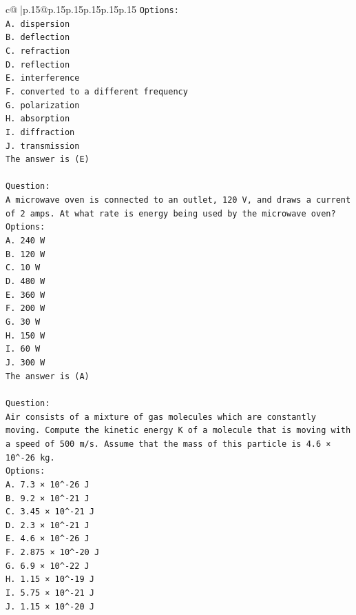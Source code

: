 \documentclass{article}
\begin{document}
{\begin{supertabular}{c@{$\;$}|p{.15\linewidth}@{}p{.15\linewidth}p{.15\linewidth}p{.15\linewidth}p{.15\linewidth}p{.15\linewidth}}
{{{\texttt{Options:} \\
\texttt{A. dispersion} \\
\texttt{B. deflection} \\
\texttt{C. refraction} \\
\texttt{D. reflection} \\
\texttt{E. interference} \\
\texttt{F. converted to a different frequency} \\
\texttt{G. polarization} \\
\texttt{H. absorption} \\
\texttt{I. diffraction} \\
\texttt{J. transmission} \\
\texttt{The answer is (E)} \\
\\ 
\texttt{Question:} \\
\texttt{A microwave oven is connected to an outlet, 120 V, and draws a current of 2 amps. At what rate is energy being used by the microwave oven?} \\
\texttt{Options:} \\
\texttt{A. 240 W} \\
\texttt{B. 120 W} \\
\texttt{C. 10 W} \\
\texttt{D. 480 W} \\
\texttt{E. 360 W} \\
\texttt{F. 200 W} \\
\texttt{G. 30 W} \\
\texttt{H. 150 W} \\
\texttt{I. 60 W} \\
\texttt{J. 300 W} \\
\texttt{The answer is (A)} \\
\\ 
\texttt{Question:} \\
\texttt{Air consists of a mixture of gas molecules which are constantly moving. Compute the kinetic energy K of a molecule that is moving with a speed of 500 m/s. Assume that the mass of this particle is 4.6 × 10\^{}{-}26 kg.} \\
\texttt{Options:} \\
\texttt{A. 7.3 × 10\^{}{-}26 J} \\
\texttt{B. 9.2 × 10\^{}{-}21 J} \\
\texttt{C. 3.45 × 10\^{}{-}21 J} \\
\texttt{D. 2.3 × 10\^{}{-}21 J} \\
\texttt{E. 4.6 × 10\^{}{-}26 J} \\
\texttt{F. 2.875 × 10\^{}{-}20 J} \\
\texttt{G. 6.9 × 10\^{}{-}22 J} \\
\texttt{H. 1.15 × 10\^{}{-}19 J} \\
\texttt{I. 5.75 × 10\^{}{-}21 J} \\
\texttt{J. 1.15 × 10\^{}{-}20 J} \\
            }
        }
    }
     \\ \\


\end{supertabular}}
\end{document}
